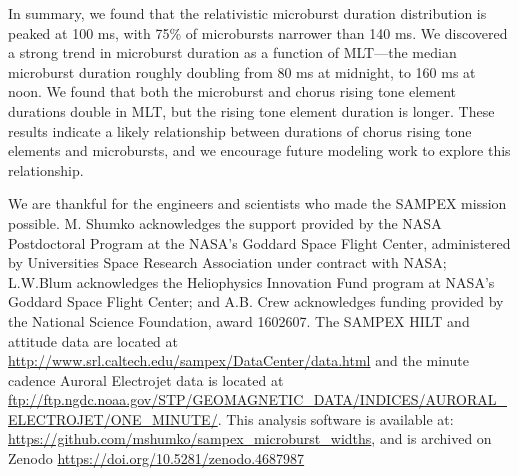 \documentclass[draft]{agujournal2019}
\begin{document}
In summary, we found that the relativistic microburst duration distribution is peaked at 100 ms, with 75\% of microbursts narrower than 140 ms. We discovered a strong trend in microburst duration as a function of MLT---the median microburst duration roughly doubling from 80 ms at midnight, to 160 ms at noon. We found that both the microburst and chorus rising tone element durations double in MLT, but the rising tone element duration is longer. These results indicate a likely relationship between durations of chorus rising tone elements and microbursts, and we encourage future modeling work to explore this relationship.


%
%
%
%

\acknowledgments
We are thankful for the engineers and scientists who made the SAMPEX mission possible. M. Shumko acknowledges the support provided by the NASA Postdoctoral Program at the NASA’s Goddard Space Flight Center, administered by Universities Space Research Association under contract with NASA; L.W.Blum acknowledges the Heliophysics Innovation Fund program at NASA’s Goddard Space Flight Center; and A.B. Crew acknowledges funding provided by the National Science Foundation, award 1602607. The SAMPEX HILT and attitude data are located at \url{http://www.srl.caltech.edu/sampex/DataCenter/data.html} and the minute cadence Auroral Electrojet data is located at \url{ftp://ftp.ngdc.noaa.gov/STP/GEOMAGNETIC_DATA/INDICES/AURORAL_ELECTROJET/ONE_MINUTE/}.
This analysis software is available at: \url{https://github.com/mshumko/sampex_microburst_widths}, and is archived on Zenodo \url{https://doi.org/10.5281/zenodo.4687987}



%
%
\end{document}
